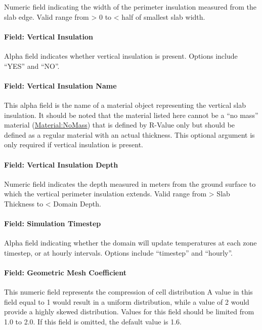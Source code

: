 Numeric field indicating the width of the perimeter insulation measured from the slab edge. Valid range from \textgreater{} 0 to \textless{} half of smallest slab width.

\paragraph{Field: Vertical Insulation}\label{field-vertical-insulation}

Alpha field indicates whether vertical insulation is present. Options include ``YES'' and ``NO''.

\paragraph{Field: Vertical Insulation Name}\label{field-vertical-insulation-name}

This alpha field is the name of a material object representing the vertical slab insulation. It should be noted that the material listed here cannot be a ``no mass'' material  (\hyperref[materialnomass]{Material:NoMass}) that is defined by R-Value only but should be defined as a regular material with an actual thickness. This optional argument is only required if vertical insulation is present.

\paragraph{Field: Vertical Insulation Depth}\label{field-vertical-insulation-depth}

Numeric field indicates the depth measured in meters from the ground surface to which the vertical perimeter insulation extends. Valid range from \textgreater{} Slab Thickness to \textless{} Domain Depth.

\paragraph{Field: Simulation Timestep}\label{field-simulation-timestep}

Alpha field indicating whether the domain will update temperatures at each zone timestep, or at hourly intervals. Options include ``timestep'' and ``hourly''.

\paragraph{Field: Geometric Mesh Coefficient}

This numeric field represents the compression of cell distribution A value in this field equal to 1 would result in a uniform distribution, while a value of 2 would provide a highly skewed distribution. Values for this field should be limited from 1.0 to 2.0. If this field is omitted, the default value is 1.6.

